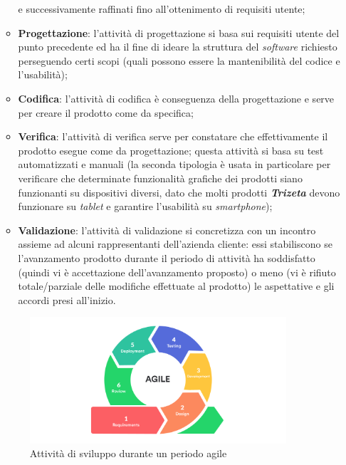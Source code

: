 \begin{itemize}
\begin{itemize}
                e successivamente raffinati fino all'ottenimento di requisiti utente;
            \item \textbf{Progettazione}: l'attività di progettazione si basa sui requisiti utente del punto precedente ed ha il fine di ideare la struttura del \textit{software} richiesto perseguendo certi scopi 
                (quali possono essere la mantenibilità del codice e l'usabilità);
            \item \textbf{Codifica}: l'attività di codifica è conseguenza della progettazione e serve per creare il prodotto come da specifica;
            \item \textbf{Verifica}: l'attività di verifica serve per constatare che effettivamente il prodotto esegue come da progettazione; questa attività si basa su test automatizzati e manuali (la seconda tipologia
                è usata in particolare per verificare che determinate funzionalità grafiche dei prodotti siano funzionanti su dispositivi diversi, dato che molti prodotti \textit{\textbf{Trizeta}} devono
                funzionare su \textit{tablet} e garantire l'usabilità su \textit{smartphone});
            \item \textbf{Validazione}: l'attività di validazione si concretizza con un incontro assieme ad alcuni rappresentanti dell'azienda cliente: essi stabiliscono se l'avanzamento prodotto durante il periodo di attività ha soddisfatto
                (quindi vi è accettazione dell'avanzamento proposto) o meno (vi è rifiuto totale/parziale delle modifiche effettuate al prodotto) le aspettative e gli accordi presi all'inizio.
        \end{itemize}
        \begin{figure}[H]
            \centering
            \includegraphics[width=0.9\textwidth]{images/agile.png}
            \caption[Attività di sviluppo durante un periodo agile]{Attività di sviluppo durante un periodo agile}
        \end{figure}

\end{itemize}
